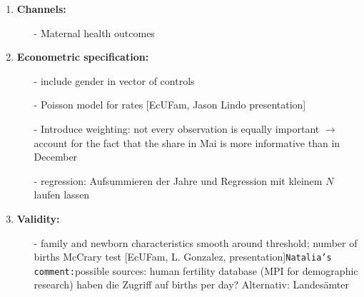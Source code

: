 \documentclass[11pt,a4paper]{article}
\begin{document}
{\begin{enumerate}
\item \textbf{Channels:}\vspace{-1em}
\begin{itemize}
\item[-] Maternal health outcomes
\end{itemize}


\item \textbf{Econometric specification:}\vspace{-1em}
\begin{itemize}
\item[-] include gender in vector of controls
\item[-] Poisson model for rates [EcUFam, Jason Lindo presentation]
\item[-] Introduce weighting: not every observation is equally important $\rightarrow$ account for the fact that the share in Mai is more informative than in December
\item[-] regression: Aufsummieren der Jahre und Regression mit kleinem $N$ laufen lassen
\end{itemize}


\item \textbf{Validity:}\vspace{-1em}
\begin{itemize}
\item[-] family and newborn characteristics smooth around threshold; number of births McCrary test [EcUFam, L. Gonzalez, presentation]\newline \texttt{Natalia's comment:}possible sources: human fertility database (MPI for demographic research) haben die Zugriff auf births per day? Alternativ: Landesämter
\end{itemize}



\end{enumerate}}
\end{document}
